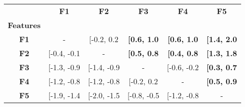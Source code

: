\setcellgapes{1ex}\makegapedcells\centering\begin{tabular*}{\textwidth}{c|@{\extracolsep{\fill}}ccccc}
\toprule
{} &  \textbf{F1} &  \textbf{F2} &         \textbf{F3} &         \textbf{F4} &         \textbf{F5} \\
\textbf{Features} &              &              &                     &                     &                     \\
\midrule
\textbf{F1      } &  - &  [-0.2, 0.2 &  \textbf{[0.6, 1.0} &  \textbf{[0.6, 1.0} &  \textbf{[1.4, 2.0} \\
\textbf{F2      } &  [-0.4, -0.1 &  - &  \textbf{[0.5, 0.8} &  \textbf{[0.4, 0.8} &  \textbf{[1.3, 1.8} \\
\textbf{F3      } &  [-1.3, -0.9 &  [-1.4, -0.9 &  - &  [-0.6, -0.2 &  \textbf{[0.3, 0.7} \\
\textbf{F4      } &  [-1.2, -0.8 &  [-1.2, -0.8 &  [-0.2, 0.2 &  - &  \textbf{[0.5, 0.9} \\
\textbf{F5      } &  [-1.9, -1.4 &  [-2.0, -1.5 &  [-0.8, -0.5 &  [-1.2, -0.8 &  - \\
\bottomrule
\end{tabular*}
